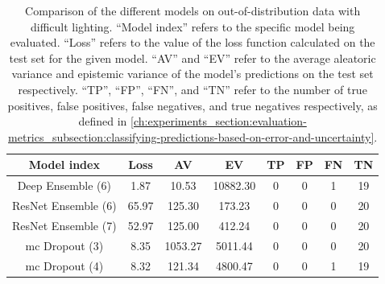 \begin{table}[H]
    \centering
    \begin{tabular}{c !{\vrule width 2pt} c|c|c|c|c|c|c}
        \textbf{Model index} & \textbf{Loss} & \textbf{AV} & \textbf{EV} & \textbf{TP} & \textbf{FP} & \textbf{FN} & \textbf{TN} \\
        \hline
        Deep Ensemble (6) & 1.87 & 10.53 & 10882.30 & 0 & 0 & 1 & 19 \\
        ResNet Ensemble (6) & 65.97 & 125.30 & 173.23 & 0 & 0 & 0 & 20 \\
        ResNet Ensemble (7) & 52.97 & 125.00 & 412.24 & 0 & 0 & 0 & 20 \\
        \gls{mc} Dropout (3) & 8.35 & 1053.27 & 5011.44 & 0 & 0 & 0 & 20 \\
        \gls{mc} Dropout (4) & 8.32 & 121.34 & 4800.47 & 0 & 0 & 1 & 19 \\
    \end{tabular}
    \caption[Comparison of the different models on out-of-distribution data with difficult lighting.]{
        Comparison of the different models on out-of-distribution data with difficult lighting.
        ``Model index'' refers to the specific model being evaluated.
        ``Loss'' refers to the value of the loss function calculated on the test set for the given model.
        ``AV'' and ``EV'' refer to the average aleatoric variance and epistemic variance of the model's predictions on the test set respectively.
        ``TP'', ``FP'', ``FN'', and ``TN'' refer to the number of true positives, false positives, false negatives, and true negatives respectively, as defined in \cref{ch:experiments_section:evaluation-metrics_subsection:classifying-predictions-based-on-error-and-uncertainty}.
        }
    \label{tab:models_comparison_out-of-distribution-difficult-lighting}
\end{table}

